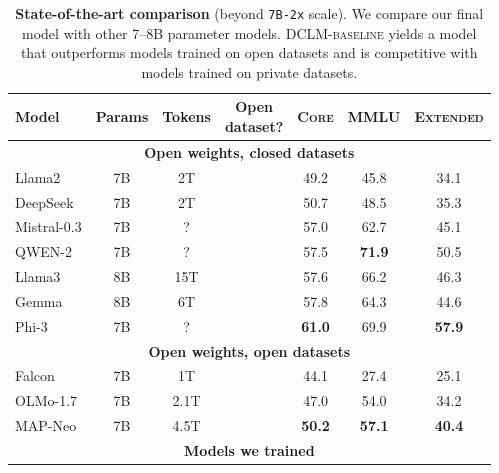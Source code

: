 \documentclass{article}
\newcommand{\cmark}{\ding{51}}
\newcommand{\xmark}{\ding{55}}
\newcommand{\hqpool}{\textsc{DCLM-baseline}\xspace}
\newcommand{\xltrack}{\texttt{7B-2x}\xspace}
\newcommand{\lowvar}{\textsc{Core}\xspace}
\newcommand{\aggscore}{\textsc{Extended}\xspace}
\begin{document}
\begin{table}[h]
\centering
\caption{\textbf{State-of-the-art comparison} (beyond \xltrack{} scale). We compare our final model with other 7--8B parameter models. \hqpool yields a model that outperforms models trained on open datasets
and is competitive with models trained on private datasets.}
\label{table:pre-main-results}

\begin{tabular}{lcccccc}
\toprule
      Model & Params & Tokens & \makecell{Open \\ dataset?} &       \lowvar &          MMLU &     \aggscore \\

\midrule
\multicolumn{7}{c}{\textbf{Open weights, closed datasets}} \\
\midrule

     Llama2 &     7B &     2T &        \xmark &          49.2 &          45.8 &          34.1 \\
   DeepSeek &     7B &     2T &        \xmark &          50.7 &          48.5 &          35.3 \\
Mistral-0.3 &     7B &      ? &        \xmark &          57.0 &          62.7 &          45.1 \\
     QWEN-2 &     7B &      ? &        \xmark &          57.5 & \textbf{71.9} &          50.5 \\
     Llama3 &     8B &    15T &        \xmark &          57.6 &          66.2 &          46.3 \\
      Gemma &     8B &     6T &        \xmark &          57.8 &          64.3 &          44.6 \\
      Phi-3 &     7B &      ? &        \xmark & \textbf{61.0} &          69.9 & \textbf{57.9} \\

\midrule
\multicolumn{7}{c}{\textbf{Open weights, open datasets}} \\
\midrule

     Falcon &     7B &     1T &        \cmark &          44.1 &          27.4 &          25.1 \\
   OLMo-1.7 &     7B &   2.1T &        \cmark &          47.0 &          54.0 &          34.2 \\
    MAP-Neo &     7B &   4.5T &        \cmark &          \textbf{50.2} &          \textbf{57.1} &          \textbf{40.4} \\

\midrule
\multicolumn{7}{c}{\textbf{Models we trained}} \\
\midrule


\end{tabular}
\end{table}
\end{document}
